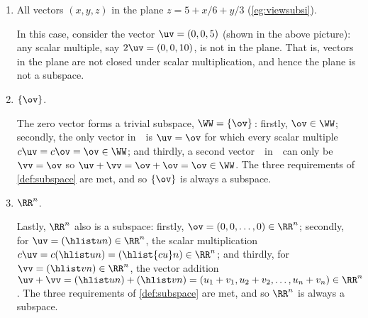\begin{example}
\begin{enumerate}
\item All vectors \((x,y,z)\) in the plane \(z=5+x/6+y/3\) (\autoref{eg:viewsubsi}).
\begin{center}
\end{center}
\begin{solution} 
In this case, consider the vector \(\uv=(0,0,5)\) (shown in the above picture): any scalar multiple, say \(2\uv=(0,0,10)\), is not in the plane.
That is, vectors in the plane are not closed under scalar multiplication, and hence the plane is not a subspace.
\end{solution}


\item\label{eg:somsubsf} \(\{\ov\}\).
\begin{solution} 
The zero vector forms a trivial subspace, \(\WW=\{\ov\}\)\,:  firstly, \(\ov\in\WW\);
secondly, the only vector in~\WW\ is \(\uv=\ov\) for which every scalar multiple \(c\uv=c\ov=\ov\in\WW\);
and thirdly, a second vector~\vv\ in~\WW\ can only be \(\vv=\ov\) so \(\uv+\vv=\ov+\ov=\ov\in\WW\).
The three requirements of \autoref{def:subspace} are met, and so \(\{\ov\}\) is always a subspace. 
\end{solution}

\item\label{eg:somsubsg} \(\RR^n\).
\begin{solution} \sloppy
Lastly, \(\RR^n\) also is a subspace:
firstly, \(\ov=(0,0,\ldots,0)\in\RR^n\);
secondly, for \(\uv=(\hlist un)\in\RR^n\), the scalar multiplication \(c\uv=c(\hlist un) =(\hlist{cu}n)\in\RR^n\);
and thirdly, for \(\vv=(\hlist vn)\in\RR^n\), the vector addition \(\uv+\vv=(\hlist un)+(\hlist vn) =(u_1+v_1,u_2+v_2,\ldots,u_n+v_n)\in\RR^n\).
The three requirements of \autoref{def:subspace} are met, and so \(\RR^n\) is always a subspace. 
\end{solution}

\end{enumerate}
\end{example}



